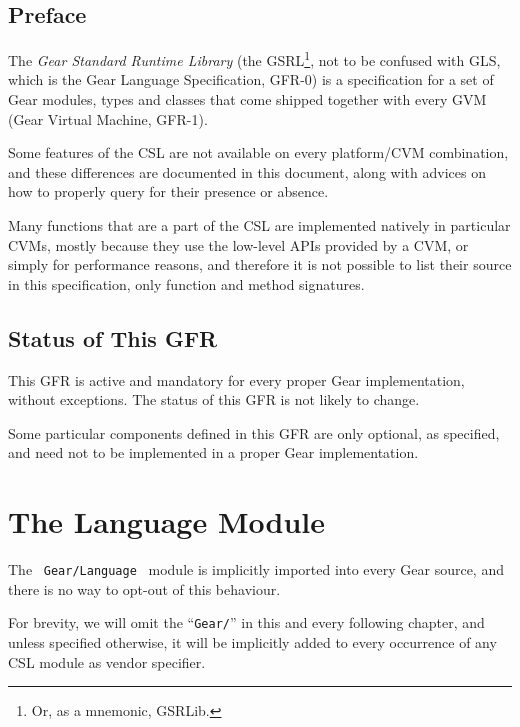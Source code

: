 
\section*{Preface}

The {\em Gear Standard Runtime Library} (the GSRL\footnote{Or, as a mnemonic, GSRLib.}, not to be confused with GLS, which is the Gear Language Specification, GFR-0) is a specification for a set of Gear modules, types and classes that come shipped together with every GVM (Gear Virtual Machine, GFR-1). 

Some features of the CSL are not available on every platform/CVM combination, and these differences are documented in this document, along with advices on how to properly query for their presence or absence. 

Many functions that are a part of the CSL are implemented natively in particular CVMs, mostly because they use the low-level APIs provided by a CVM, or simply for performance reasons, and therefore it is not possible to list their source in this specification, only function and method signatures. 





\section*{Status of This GFR}

This GFR is active and mandatory for every proper Gear implementation, without exceptions. The status of this GFR is not likely to change. 

Some particular components defined in this GFR are only optional, as specified, and need not to be implemented in a proper Gear implementation. 




\chapter{The Language Module}
\label{sec:lang}

The ~\lstinline!Gear/Language!~ module is implicitly imported into every Gear source, and there is no way to opt-out of this behaviour. 

For brevity, we will omit the ``\lstinline!Gear/!'' in this and every following chapter, and unless specified otherwise, it will be implicitly added to every occurrence of any CSL module as vendor specifier. 

